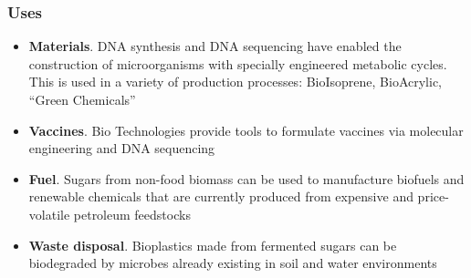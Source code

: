 \documentclass{beamer}
\begin{document}
\begin{frame}
	\frametitle{Uses}
	
	\begin{itemize}
		\item<1-> \textbf{Materials}.  DNA synthesis and DNA sequencing have enabled the construction of microorganisms with specially engineered metabolic cycles. This is used in a variety of production processes: BioIsoprene, BioAcrylic, ``Green Chemicals''
		\item<2-> \textbf{Vaccines}. Bio Technologies provide tools to formulate vaccines via molecular engineering and DNA sequencing
		\item<3-> \textbf{Fuel}. Sugars from non-food biomass can be used to manufacture biofuels and renewable chemicals that are currently produced from expensive and price-volatile petroleum feedstocks
		\item<4-> \textbf{Waste disposal}. Bioplastics made from fermented sugars can be biodegraded by microbes already existing in soil and water environments
	\end{itemize}
\end{frame}
\end{document}

